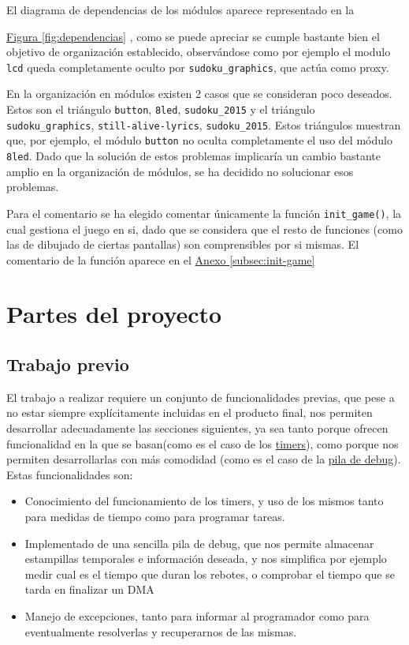 \documentclass[12pt,letterpaper]{article}
\newcommand*{\iref}[2]{
  \hyperref[#1]{#2
  \ref*{#1}}
  }
\begin{document}
El diagrama de dependencias de los módulos aparece representado en la
\iref{fig:dependencias}{Figura}, como se puede apreciar se cumple
bastante bien el objetivo de organización establecido, observándose
como por ejemplo el modulo \texttt{lcd} queda completamente oculto por
\texttt{sudoku\_graphics}, que actúa como proxy.

En la organización en módulos existen 2 casos que se consideran poco
deseados. Estos son el triángulo \texttt{button}, \texttt{8led},
\texttt{sudoku\_2015} y el triángulo \texttt{sudoku\_graphics},
\texttt{still-alive-lyrics}, \texttt{sudoku\_2015}. Estos triángulos
muestran que, por ejemplo, el módulo \texttt{button} no oculta
completamente el uso del módulo \texttt{8led}. Dado que la solución de
estos problemas implicaría un cambio bastante amplio en la
organización de módulos, se ha decidido no solucionar esos problemas.

Para el comentario se ha elegido comentar únicamente la función
\texttt{init\_game()}, la cual gestiona el juego en si, dado que se
considera que el resto de funciones (como las de dibujado de ciertas
pantallas) son comprensibles por si mismas. El comentario de la
función aparece en el \iref{subsec:init-game}{Anexo}

\section{Partes del proyecto}
\label{sec:partes}

\subsection{Trabajo previo}
\label{subsec:previous}

El trabajo a realizar requiere un conjunto de funcionalidades previas,
que pese a no estar siempre explícitamente incluidas en el producto
final, nos permiten desarrollar adecuadamente las secciones
siguientes, ya sea tanto porque ofrecen funcionalidad en la que se
basan(como es el caso de los \hyperref[subsubsec:timers]{timers}),
como porque nos permiten desarrollarlas con más comodidad (como es el
caso de la \hyperref[subsubsec:pila-debug]{pila de debug}). Estas
funcionalidades son:
\begin{itemize}
  \item Conocimiento del funcionamiento de los timers, y uso de los
    mismos tanto para medidas de tiempo como para programar tareas.
  \item Implementado de una sencilla pila de debug, que nos permite
    almacenar estampillas temporales e información deseada, y nos
    simplifica por ejemplo medir cual es el tiempo que duran los
    rebotes, o comprobar el tiempo que se tarda en finalizar un DMA
  \item Manejo de excepciones, tanto para informar al programador como
    para eventualmente resolverlas y recuperarnos de las mismas.
\end{itemize}
\end{document}
